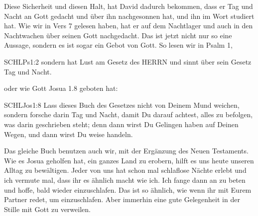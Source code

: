 \documentclass[fontsize=16pt]{mybib}
\begin{document}
    \begin{otsblock}
        Diese Sicherheit und diesen Halt, hat David dadurch bekommen, dass er Tag und Nacht an Gott gedacht und über ihn nachgesonnen hat, und ihn im Wort studiert hat. Wie wir in Vers 7 gelesen haben, hat er auf dem Nachtlager und auch in den Nachtwachen über seinen Gott nachgedacht. Das ist jetzt nicht nur so eine Aussage, sondern es ist sogar ein Gebot von Gott. So lesen wir in Psalm 1,
        \begin{bibelbox}{SCHL}{Ps}{1:2}
            sondern hat Lust am Gesetz des HERRN und sinnt über sein Gesetz Tag und Nacht.
        \end{bibelbox}
        oder wie Gott Josua 1.8 geboten hat:
        \begin{bibelbox}{SCHL}{Jos}{1:8}
            Lass dieses Buch des Gesetzes nicht von Deinem Mund weichen, sondern forsche darin Tag und Nacht, damit Du darauf achtest, alles zu befolgen, was darin geschrieben steht; denn dann wirst Du Gelingen haben auf Deinen Wegen, und dann wirst Du weise handeln.
        \end{bibelbox}
        Das gleiche Buch benutzen auch wir, mit der Ergänzung des Neuen Testaments. Wie es Josua geholfen hat, ein ganzes Land zu erobern, hilft es uns heute unseren Alltag zu bewältigen.
        Jeder von uns hat schon mal schlaflose Nächte erlebt und ich vermute mal, dass ihr es ähnlich macht wie ich. Ich fange dann an zu beten und hoffe, bald wieder einzuschlafen. Das ist so ähnlich, wie wenn ihr mit Eurem Partner redet, um einzuschlafen. Aber immerhin eine gute Gelegenheit in der Stille mit Gott zu verweilen.
    \end{otsblock}   
\end{document}
